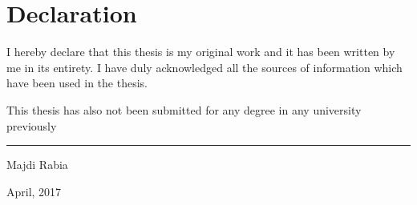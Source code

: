 \documentclass[english,11pt,openany]{report}
\theoremstyle{definition}
\newcommand\blankpage{%
	\null
	\thispagestyle{empty}%
	\addtocounter{page}{-1}%
	\newpage}
\theoremstyle{plain}
\theoremstyle{definition}
\begin{document}

\blankpage

\section*{Declaration}

I hereby declare that this thesis is my original work and it has been written by me in its entirety. I have duly acknowledged all the sources of information which have been used in the thesis.


This thesis has also not been submitted for any degree in any university previously

\vspace{20mm}  %

\hspace{80mm}\rule{40mm}{.15mm}\par   %
\hspace{80mm} Majdi Rabia\par
\hspace{80mm} April, 2017


\blankpage
\newpage
\end{document}
